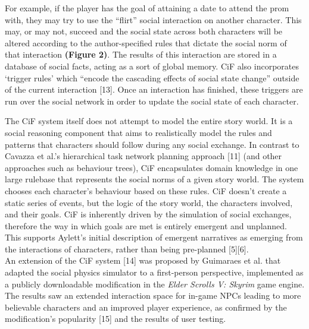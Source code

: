 \documentclass{sig-alternate-05-2015}
\begin{document}
For example, if the player has the goal of attaining a date to attend the prom with, they may try to use the ``flirt'' social interaction on another character. This may, or may not, succeed and the social state across both characters will be altered according to the author-specified rules that dictate the social norm of that interaction \textbf{(Figure 2)}. The results of this interaction are stored in a database of social facts, acting as a sort of global memory. CiF also incorporates `trigger rules' which ``encode the cascading effects of social state change'' outside of the current interaction [13]. Once an interaction has finished, these triggers are run over the social network in order to update the social state of each character.

The CiF system itself does not attempt to model the entire story world. It is a social reasoning component that aims to realistically model the rules and patterns that characters should follow during any social exchange. In contrast to Cavazza et al.'s hierarchical task network planning approach [11] (and other approaches such as behaviour trees), CiF encapsulates domain knowledge in one large rulebase that represents the social norms of a given story world. The system chooses each character's behaviour based on these rules. CiF doesn't create a static series of events, but the logic of the story world, the characters involved, and their goals. CiF is inherently driven by the simulation of social exchanges, therefore the way in which goals are met is entirely emergent and unplanned. This supports Aylett's initial description of emergent narratives as emerging from the interactions of characters, rather than being pre-planned [5][6].\\

An extension of the CiF system [14] was proposed by Guimaraes et al. that adapted the social physics simulator to a first-person perspective, implemented as a publicly downloadable modification in the \textit{Elder Scrolls V: Skyrim} game engine. The results saw an extended interaction space for in-game NPCs leading to more believable characters and an improved player experience, as confirmed by the modification's popularity [15] and the results of user testing.
\end{document}

